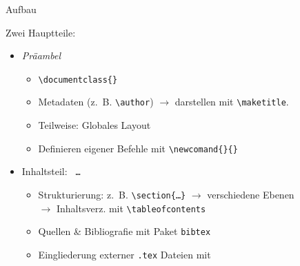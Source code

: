 
\begin{frame}[fragile]{Aufbau}

	Zwei Hauptteile:
	\begin{itemize}[<+-|alert@+>]
		\item \textit{Präambel}
			\begin{itemize}
				\item \verb|\documentclass{}|
				\item Metadaten (z.~B. \verb|\author|) $\rightarrow$ darstellen mit \verb|\maketitle|.
				\item Teilweise: Globales Layout
				\item Definieren eigener Befehle mit \verb|\newcomand{}{}|
			\end{itemize}
		\item Inhaltsteil: \verb| … |
			\begin{itemize}
				\item Strukturierung: z.~B. \verb|\section{…}| $\rightarrow$ verschiedene Ebenen \\$\rightarrow$ Inhaltsverz. mit \verb|\tableofcontents|
                \item Quellen \& Bibliografie mit Paket {\color{blue} \texttt{bibtex}}
				\item Eingliederung externer \texttt{.tex} Dateien mit \verb||
			\end{itemize}
	\end{itemize}
\end{frame}
